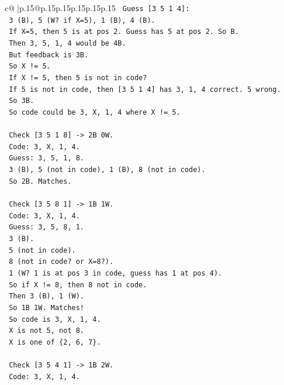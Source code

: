 \documentclass{article}
\begin{document}
{\begin{supertabular}{c@{$\;$}|p{.15\linewidth}@{}p{.15\linewidth}p{.15\linewidth}p{.15\linewidth}p{.15\linewidth}p{.15\linewidth}}
{{{\texttt{   Guess {[}3 5 1 4{]}:} \\
\texttt{   3 (B), 5 (W? if X=5), 1 (B), 4 (B).} \\
\texttt{   If X=5, then 5 is at pos 2. Guess has 5 at pos 2. So B.} \\
\texttt{   Then 3, 5, 1, 4 would be 4B.} \\
\texttt{   But feedback is 3B.} \\
\texttt{   So X != 5.} \\
\texttt{   If X != 5, then 5 is not in code?} \\
\texttt{   If 5 is not in code, then {[}3 5 1 4{]} has 3, 1, 4 correct. 5 wrong.} \\
\texttt{   So 3B.} \\
\texttt{   So code could be 3, X, 1, 4 where X != 5.} \\
\\ 
\texttt{   Check {[}3 5 1 8{]} {-}> 2B 0W.} \\
\texttt{   Code: 3, X, 1, 4.} \\
\texttt{   Guess: 3, 5, 1, 8.} \\
\texttt{   3 (B), 5 (not in code), 1 (B), 8 (not in code).} \\
\texttt{   So 2B. Matches.} \\
\\ 
\texttt{   Check {[}3 5 8 1{]} {-}> 1B 1W.} \\
\texttt{   Code: 3, X, 1, 4.} \\
\texttt{   Guess: 3, 5, 8, 1.} \\
\texttt{   3 (B).} \\
\texttt{   5 (not in code).} \\
\texttt{   8 (not in code? or X=8?).} \\
\texttt{   1 (W? 1 is at pos 3 in code, guess has 1 at pos 4).} \\
\texttt{   So if X != 8, then 8 not in code.} \\
\texttt{   Then 3 (B), 1 (W).} \\
\texttt{   So 1B 1W. Matches!} \\
\texttt{   So code is 3, X, 1, 4.} \\
\texttt{   X is not 5, not 8.} \\
\texttt{   X is one of \{2, 6, 7\}.} \\
\\ 
\texttt{   Check {[}3 5 4 1{]} {-}> 1B 2W.} \\
\texttt{   Code: 3, X, 1, 4.} \\
}}}
\end{supertabular}}
\end{document}
